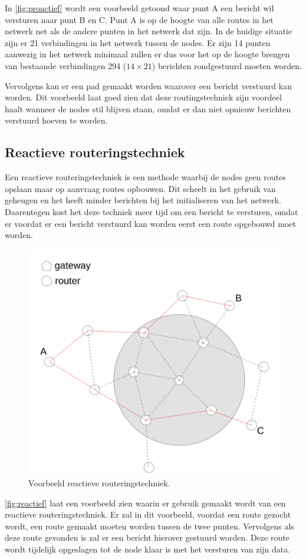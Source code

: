 \documentclass[a4paper, 11pt, oneside]{report}
\begin{document}
In \autoref{fig:proactief} wordt een voorbeeld getoond waar punt A een bericht wil versturen naar punt B en C. 
Punt A is op de hoogte van alle routes in het netwerk net als de andere punten in het netwerk dat zijn.
In de huidige situatie zijn er 21 verbindingen in het netwerk tussen de nodes.
Er zijn 14 punten aanwezig in het netwerk minimaal zullen er dus voor het op de hoogte brengen van bestaande verbindingen 294 ($14 \times 21$) berichten rondgestuurd moeten worden. 

Vervolgens kan er een pad gemaakt worden waarover een bericht verstuurd kan worden.
Dit voorbeeld laat goed zien dat deze routingstechniek zijn voordeel haalt wanneer de nodes stil blijven staan, omdat er dan niet opnieuw berichten verstuurd hoeven te worden. 
 
\subsection{Reactieve routeringstechniek}
\label{sec:meshnetwerktechniek:reactieve}

Een reactieve routeringstechniek is een methode waarbij de nodes geen routes opslaan maar op aanvraag routes opbouwen. 
Dit scheelt in het gebruik van geheugen en het heeft minder berichten bij het initialiseren van het netwerk. Daarentegen kost het deze techniek meer tijd om een bericht te versturen, omdat er voordat er een bericht verstuurd kan worden eerst een route opgebouwd moet worden.

\begin{figure}[H]
	\begin{center}\includegraphics[width=0.45\linewidth]{Afbeeldingen/reactive.png}\end{center}
	\caption{Voorbeeld reactieve routeringstechniek.}
	\label{fig:reactief}
\end{figure}

\autoref{fig:reactief} laat een voorbeeld zien waarin er gebruik gemaakt wordt van een reactieve routeringstechniek.
Er zal in dit voorbeeld, voordat een route gezocht wordt, een route gemaakt moeten worden tussen de twee punten.
Vervolgens als deze route gevonden is zal er een bericht hierover gestuurd worden. 
Deze route wordt tijdelijk opgeslagen tot de node klaar is met het versturen van zijn data.
\end{document}
